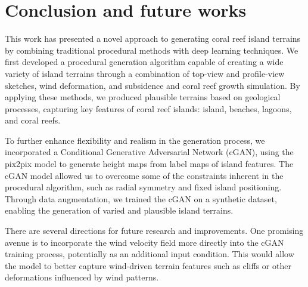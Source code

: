 
\section{Conclusion and future works}
\label{sec:coral-island-conclusion}

This work has presented a novel approach to generating coral reef island terrains by combining traditional procedural methods with deep learning techniques. We first developed a procedural generation algorithm capable of creating a wide variety of island terrains through a combination of top-view and profile-view sketches, wind deformation, and subsidence and coral reef growth simulation. By applying these methods, we produced plausible terrains based on geological processes, capturing key features of coral reef islands: island, beaches, lagoons, and coral reefs.

To further enhance flexibility and realism in the generation process, we incorporated a Conditional Generative Adversarial Network (cGAN), using the pix2pix model to generate height maps from label maps of island features. The cGAN model allowed us to overcome some of the constraints inherent in the procedural algorithm, such as radial symmetry and fixed island positioning. Through data augmentation, we trained the cGAN on a synthetic dataset, enabling the generation of varied and plausible island terrains.


There are several directions for future research and improvements. One promising avenue is to incorporate the wind velocity field more directly into the cGAN training process, potentially as an additional input condition. This would allow the model to better capture wind-driven terrain features such as cliffs or other deformations influenced by wind patterns.

